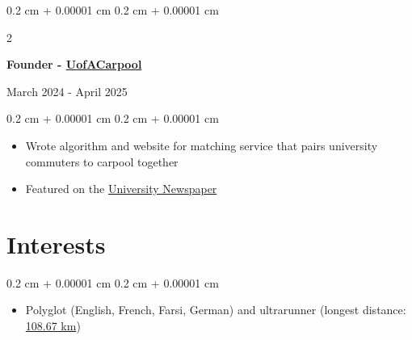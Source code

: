 \documentclass[10pt, letterpaper]{article}
\newenvironment{highlights}{
    \begin{itemize}[
        topsep=0.10 cm,
        parsep=0.10 cm,
        partopsep=0pt,
        itemsep=0pt,
        leftmargin=0.4 cm + 10pt
    ]
}{
    \end{itemize}
}
\newenvironment{onecolentry}{
    \begin{adjustwidth}{
        0.2 cm + 0.00001 cm
    }{
        0.2 cm + 0.00001 cm
    }
}{
    \end{adjustwidth}
}
\newenvironment{twocolentry}[2][]{
    \begin{adjustwidth}{
        0.2 cm + 0.00001 cm
    }{
        0.2 cm + 0.00001 cm
    }
    \def\secondColumn{#2}
    \setcolumnwidth{\fill, 4.5 cm}
    \begin{paracol}{2}
}{
    \switchcolumn \raggedleft \secondColumn
    \end{paracol}
    \end{adjustwidth}
}
\let\hrefWithoutArrow\href
\renewcommand{\href}[2]{\hrefWithoutArrow{#1}{#2}}
\begin{document}
        \vspace{0.09 cm}

        \begin{twocolentry}{
            March 2024 - April 2025
        }
            \textbf{Founder - \href{https://kiankyars.github.io/uofacarpool/}{UofACarpool}}
        \end{twocolentry}

        \vspace{0.09 cm}
        \begin{onecolentry}
            \begin{highlights}
                \item Wrote algorithm and website for matching service that pairs university commuters to carpool together
                \item Featured on the \href{https://thegatewayonline.ca/2024/10/u-of-a-carpool-aims-to-make-campus-more-eco-friendly/}{University Newspaper}
            \end{highlights}
        \end{onecolentry}

        \vspace{0.09 cm}

    \section{Interests}
        \begin{onecolentry}
            \begin{highlights}
                \item Polyglot (English, French, Farsi, German) and ultrarunner (longest distance: \href{https://flow.polar.com/shared/7ea63b8f2e9504d06c913efc08e9c8cd}{108.67 km})
            \end{highlights}
        \end{onecolentry}
        
\end{document}
